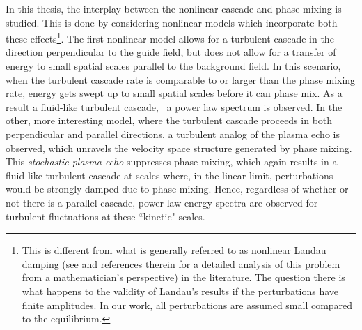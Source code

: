     In this thesis, the interplay between the nonlinear cascade and phase mixing is
    studied.
    This is done by considering nonlinear models which incorporate both these effects\footnote{This is different from what is generally referred to as nonlinear
    Landau damping (see \cite{mouhot11} and references therein for a detailed analysis of
	this problem from a mathematician's perspective) in the literature. The question there
	is what happens to the validity of Landau's results
    if the perturbations have finite amplitudes. In our work, all perturbations are
    assumed small compared to the equilibrium.}.
%    
%
%
    The first nonlinear model allows for a turbulent cascade in the direction
    perpendicular to the guide field, but does not allow for a transfer of energy to small
    spatial scales parallel to the background field. In this scenario, when the turbulent
    cascade rate is comparable to or larger than the phase mixing rate, energy gets swept up
    to small spatial scales before it can phase mix. As a result a fluid-like turbulent
    cascade, \ie\, a power law spectrum is observed. In the other, more interesting model, where the turbulent cascade
    proceeds in both perpendicular and parallel directions, 
    a turbulent analog
    of the plasma echo is observed, which unravels the velocity space structure generated by
    phase mixing. This
    \textit{stochastic plasma echo} suppresses phase mixing, which again results in a fluid-like
    turbulent cascade at scales where, in the linear limit, perturbations would be
    strongly damped due to phase mixing. Hence, regardless of whether or not there is a
    parallel cascade, power law energy spectra are observed for
    turbulent fluctuations at these ``kinetic" scales.
    
